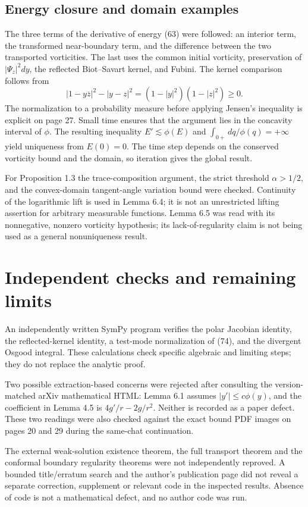 \documentclass[10pt]{article}
\begin{document}
\subsection*{Energy closure and domain examples}
The three terms of the derivative of energy (63) were followed: an interior term, the transformed near-boundary term, and the difference between the two transported vorticities. The last uses the common initial vorticity, preservation of \(|\Psi_z|^2dy\), the reflected Biot–Savart kernel, and Fubini. The kernel comparison follows from \[|1-y\overline z|^2-|y-z|^2
 =(1-|y|^2)(1-|z|^2)\geq0 .\] The normalization to a probability measure before applying Jensen’s inequality is explicit on page 27. Small time ensures that the argument lies in the concavity interval of \(\phi\). The resulting inequality \(E'\lesssim\phi(E)\) and \(\int_{0+}dq/\phi(q)=+\infty\) yield uniqueness from \(E(0)=0\). The time step depends on the conserved vorticity bound and the domain, so iteration gives the global result.\par
For Proposition 1.3 the trace-composition argument, the strict threshold \(\alpha>1/2\), and the convex-domain tangent-angle variation bound were checked. Continuity of the logarithmic lift is used in Lemma 6.4; it is not an unrestricted lifting assertion for arbitrary measurable functions. Lemma 6.5 was read with its nonnegative, nonzero vorticity hypothesis; its lack-of-regularity claim is not being used as a general nonuniqueness result.\par
\section*{Independent checks and remaining limits}
An independently written SymPy program verifies the polar Jacobian identity, the reflected-kernel identity, a test-mode normalization of (74), and the divergent Osgood integral. These calculations check specific algebraic and limiting steps; they do not replace the analytic proof.\par
Two possible extraction-based concerns were rejected after consulting the version-matched arXiv mathematical HTML: Lemma 6.1 assumes \(|y'|\leq c\phi(y)\), and the coefficient in Lemma 4.5 is \(4g'/r-2g/r^2\). Neither is recorded as a paper defect. These two readings were also checked against the exact bound PDF images on pages 20 and 29 during the same-chat continuation.\par
The external weak-solution existence theorem, the full transport theorem and the conformal boundary regularity theorems were not independently reproved. A bounded title/erratum search and the author’s publication page did not reveal a separate correction, supplement or relevant code in the inspected results. Absence of code is not a mathematical defect, and no author code was run.\par
\end{document}
